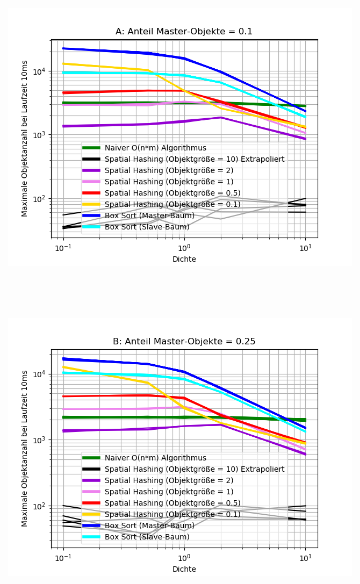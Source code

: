 \begin{figure}
	\begin{subfigure}[t]{0.55\textwidth}
		\centering
		\includegraphics[width=1\textwidth]{./res/asymComparison-A.png}
		
		\label{fig:asymComparison-A}
	\end{subfigure}
~
	\begin{subfigure}[t]{0.55\textwidth}
		\centering
		\includegraphics[width=1\textwidth]{./res/asymComparison-B.png}


\end{subfigure}
\end{figure}
